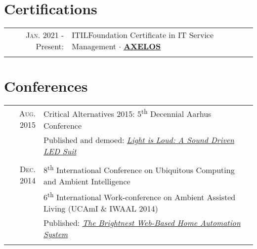 \documentclass[letterpaper,10pt]{article}
\begin{document}
\section{Certifications}
\begin{tabular}{rl}
	\textsc{Jan.} 2021 - Present: & \textsc{ITIL}\textsuperscript{\circledR}\phantom{ }Foundation Certificate in IT Service Management
	$\cdot$ \href{https://www.axelos.com/successful-candidates-register}{\textbf{AXELOS}}                                              \\\\
\end{tabular}

\section{Conferences}
\begin{tabular}{R|B}
	\textsc{Aug.} 2015 & Critical Alternatives 2015: 5\textsuperscript{th} Decennial Aarhus Conference                        \\
	                   & \small Published and demoed: \href{https://doi.org/10.7146/aahcc.v1i1.21320}
	{\emph{Light is Loud: A Sound Driven LED Suit}}                                                                           \\
	                                                                                                      \\

	\textsc{Dec.} 2014 & 8\textsuperscript{th} International Conference on Ubiquitous Computing and Ambient Intelligence      \\
	                   & 6\textsuperscript{th} International Work-conference on Ambient Assisted Living (UCAmI \& IWAAL 2014) \\
	                   & \small Published: \href{https://doi.org/10.1007/978-3-319-13102-3_14}
	{\emph{The Brightnest Web-Based Home Automation System}}                                                                  \\
	                                                                                                      \\
\end{tabular}
\end{document}
